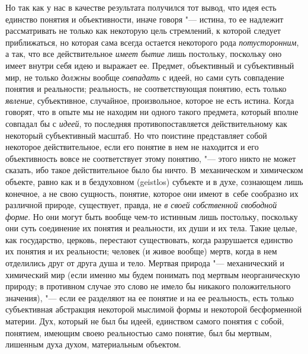 Но так как у нас в качестве результата получился тот вывод,
что идея есть единство понятия и объективности, иначе говоря
"--- истина, то ее надлежит рассматривать не только как
некоторую цель стремлений, к которой следует приближаться, но которая сама
всегда остается некоторого рода
{\em потусторонним}, а
так, что все действительное {\em имеет
бытие} лишь постольку, поскольку оно имеет внутри себя идею
и выражает ее. Предмет, объективный и субъективный мир, не только
{\em должны} вообще
{\em совпадать}
с идеей, но сами суть совпадение понятия и реальности;
реальность, не соответствующая понятию, есть только
{\em явление},
субъективное, случайное, произвольное, которое не есть
истина. Когда говорят, что в опыте мы не находим ни одного такого предмета,
который вполне совпадал бы с
{\em идеей}, то последняя
противопоставляется действительному как некоторый
субъективный масштаб. Но что поистине представляет собой некоторое
действительное, если его понятие в нем не находится и его объективность
вовсе не соответствует этому понятию, "--- этого никто не может
сказать, ибо такое действительное было бы ничто. В~механическом и
химическом объекте, равно как и в бездуховном (geistlos)
субъекте и в духе, сознающем лишь конечное, а не свою
сущность, понятие, которое они имеют в~себе сообразно их различной природе,
существует, правда, не {\em в своей
собственной свободной форме}. Но они могут быть вообще
чем-то истинным лишь постольку, поскольку они суть соединение их понятия и
реальности, их души и их тела. Такие целые, как государство, церковь,
перестают существовать, когда разрушается единство их понятия и их
реальности; человек (и живое вообще) мертв, когда в нем отделились друг от
друга душа и тело. Мертвая природа "--- механический и
химический мир (если именно мы будем понимать под мертвым неорганическую
природу; в противном случае это слово не имело бы никакого положительного
значения), "--- если ее разделяют на ее понятие и на ее
реальность, есть только субъективная абстракция некоторой мыслимой формы и
некоторой бесформенной материи. Дух, который не был бы идеей, единством
самого понятия с собой, понятием, имеющим своею реальностью само понятие,
был бы мертвым, лишенным духа духом, материальным объектом.

